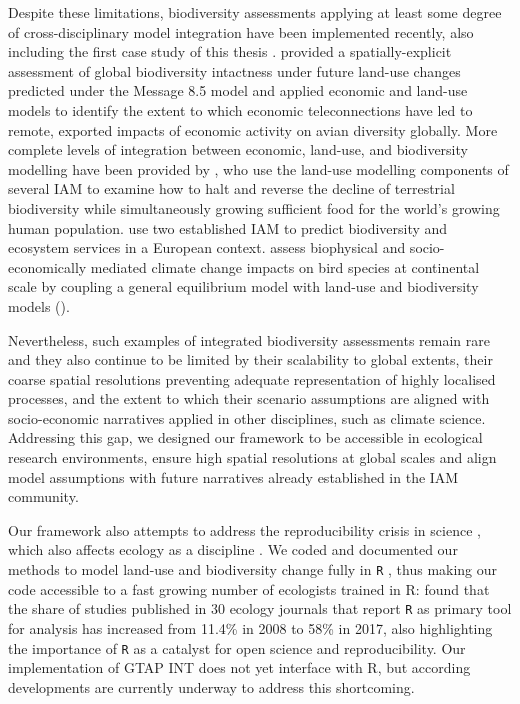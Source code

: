 \documentclass[titlesmallcaps,copyrightpage]{uomthesis}\usepackage[]{graphicx}\usepackage[]{color}
\begin{document}
Despite these limitations, biodiversity assessments applying at least some degree of cross-disciplinary model integration have been implemented recently, also including the first case study of this thesis \citep[,][]{kapitza_assessing_2021}. \citet{newbold_global_2015} provided a spatially-explicit assessment of global biodiversity intactness under future land-use changes predicted under the Message 8.5 model \citep{riahi_rcp_2011} and \citet{marques_increasing_2019} applied economic and land-use models to identify the extent to which economic teleconnections have led to remote, exported impacts of economic activity on avian diversity globally. More complete levels of integration between economic, land-use, and biodiversity modelling have been provided by \citet{leclere_bending_2020}, who use the land-use modelling components of several IAM to examine how to halt and reverse the decline of terrestrial biodiversity while simultaneously growing sufficient food for the world's growing human population. \citet{veerkamp_future_2020} use two established IAM to predict biodiversity and ecosystem services in a European context. \citet{kapitza_assessing_2021} assess biophysical and socio-economically mediated climate change impacts on bird species at continental scale by coupling a general equilibrium model with land-use and biodiversity models (). 

Nevertheless, such examples of integrated biodiversity assessments remain rare and they also continue to be limited by their scalability to global extents, their coarse spatial resolutions preventing adequate representation of highly localised processes, and the extent to which their scenario assumptions are aligned with socio-economic narratives applied in other disciplines, such as climate science. Addressing this gap, we designed our framework to be accessible in ecological research environments, ensure high spatial resolutions at global scales and align model assumptions with future narratives already established in the IAM community.

Our framework also attempts to address the reproducibility crisis in science \citep{open_science_collaboration_estimating_2015}, which also affects ecology as a discipline \citep{fidler_metaresearch_2017, fernandez-juricic_why_2021}. We coded and documented our methods to model land-use and biodiversity change fully in \texttt{R} \citep{r_development_core_team_r_2008}, thus making our code accessible to a fast growing number of ecologists trained in R: \citet{lai_evaluating_2019} found that the share of studies published in 30 ecology journals that report \texttt{R} as primary tool for analysis has increased from 11.4\% in 2008 to 58\% in 2017, also highlighting the importance of \texttt{R} as a catalyst for open science and reproducibility. Our implementation of GTAP INT does not yet interface with R, but according developments are currently underway to address this shortcoming.
\end{document}
